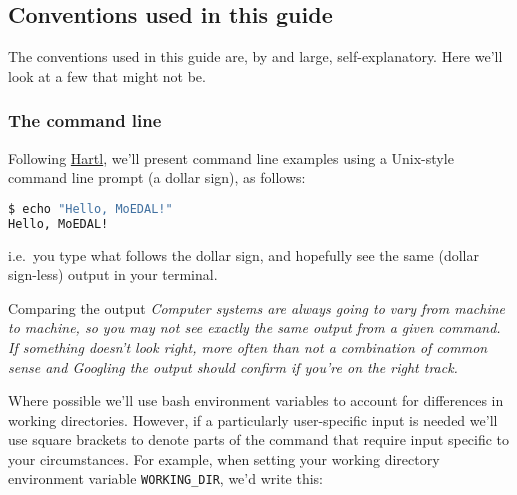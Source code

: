 \subsection{Conventions used in this guide}
\label{sec:conventions}
The conventions used in this guide are, by and large,
self-explanatory. Here we'll look at a few that might not be.

\subsubsection{The command line}
\label{sec:the-command-line}

Following \href{https://www.railstutorial.org}{Hartl}, we'll present
command line examples using a Unix-style command line prompt (a dollar
sign), as follows:

%
\begin{lstlisting}[gobble=0,numbers=none,language=bash]
$ echo "Hello, MoEDAL!"
Hello, MoEDAL!
\end{lstlisting} 

i.e.~you type what follows the dollar sign, and hopefully see the same
(dollar sign-less) output in your terminal.

\begin{warningbox}{Comparing the output}
\emph{Computer systems are always going to vary from machine to machine, so
you may not see exactly the same output from a given command.
If something doesn't look right, 
more often than not a combination of common sense and
Googling the output should confirm if you're on the right track.}
\end{warningbox}

Where possible we'll use bash environment variables to account for
differences in working directories. However, if a particularly
user-specific input is needed we'll use square brackets to denote parts
of the command that require input specific to your circumstances. For
example, when setting your working directory environment variable
\texttt{WORKING\_DIR}, we'd write this:

